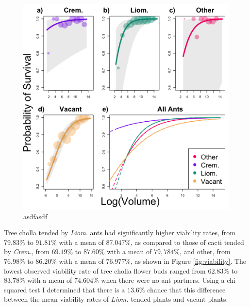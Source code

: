 \documentclass[12pt,a4paper]{article}
\begin{document}
\begin{figure}[h]
	\includegraphics[width=\linewidth]{surv_panels.png}
	\caption{asdfasdf}
	\label{fig:survival}
\end{figure}

Tree cholla tended by \textit{Liom.} ants had significantly higher viability rates, from $79.83\%$ to $91.81\%$ with a mean of $87.047\%$, as compared to those of cacti tended by \textit{Crem.}, from $69.19\%$ to $87.60\%$ with a mean of $79,784\%$, and other, from $76.98\%$ to $86.20\%$ with a mean of $76.977\%$, as shown in Figure \ref{fig:viability}. 
The lowest observed viability rate of tree cholla flower buds ranged from $62.83\%$ to $83.78\%$ with a mean of $74.604\%$ when there were no ant partners. 
Using a chi squared test I determined that there is a $13.6\%$ chance that this difference between the mean viability rates of \textit{Liom.} tended plants and vacant plants. 
\end{document}
